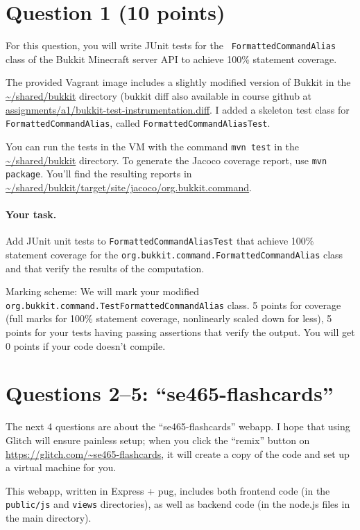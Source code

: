 \documentclass[10pt,hidelinks]{article}
\begin{document}
\newpage

\section*{Question 1 (10 points)}
For this question, you will write JUnit tests for the {\tt
  FormattedCommandAlias} class of the Bukkit Minecraft server API to
achieve 100\% statement coverage.

The provided Vagrant image includes a slightly modified version of
Bukkit in the \url{~/shared/bukkit} directory (bukkit diff also available in course
github at \url{assignments/a1/bukkit-test-instrumentation.diff}.  
I added a skeleton test class for {\tt
  FormattedCommandAlias}, called {\tt FormattedCommandAliasTest}.

You can run the tests in the VM with the command {\tt mvn test} in the
\url{~/shared/bukkit} directory.  To
generate the Jacoco coverage report, use {\tt mvn package}. You'll
find the resulting reports in
\url{~/shared/bukkit/target/site/jacoco/org.bukkit.command}.

\paragraph{Your task.} Add JUnit unit tests to {\tt FormattedCommandAliasTest}
that achieve 100\% statement 
coverage for the {\tt org.bukkit.command.FormattedCommandAlias} class
and that verify the results of the computation.

Marking scheme: We will mark your modified {\tt
  org.bukkit.command.TestFormattedCommandAlias} class.  5 points for
coverage (full marks for 100\% statement coverage, nonlinearly scaled
down for less), 5 points for your tests having passing assertions that
verify the output. You will get 0 points if your code doesn't compile.

\section*{Questions 2--5: ``se465-flashcards''}
The next 4 questions are about the ``se465-flashcards'' webapp.
I hope that using Glitch will ensure painless setup; when you click the
``remix'' button on \url{https://glitch.com/~se465-flashcards},
it will create a copy of the code and set up a virtual machine for you.

This webapp, written in Express + pug, includes both frontend code (in
the {\tt public/js} and {\tt views} directories), as well as backend code
(in the node.js files in the main directory).
\end{document}
